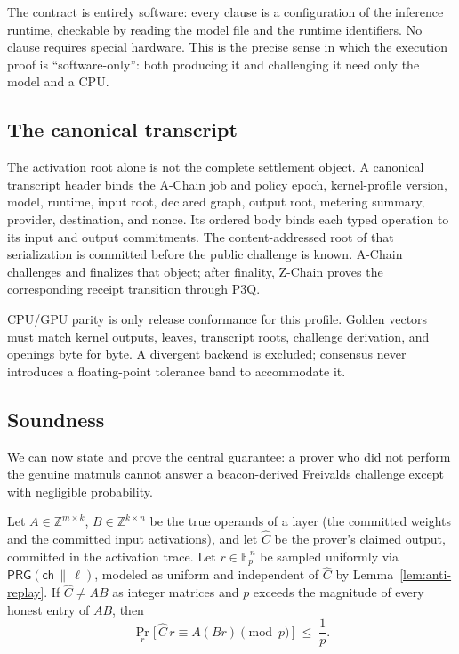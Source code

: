 The contract is entirely software: every clause is a configuration of the inference
runtime, checkable by reading the model file and the runtime identifiers. No clause
requires special hardware. This is the precise sense in which the execution proof is
``software-only'': both producing it and challenging it need only the model and a
CPU.

\subsection{The canonical transcript}

The activation root alone is not the complete settlement object. A canonical transcript
header binds the A-Chain job and policy epoch, kernel-profile version, model, runtime,
input root, declared graph, output root, metering summary, provider, destination, and
nonce. Its ordered body binds each typed operation to its input and output commitments.
The content-addressed root of that serialization is committed before the public challenge
is known. A-Chain challenges and finalizes that object; after finality, Z-Chain proves the
corresponding receipt transition through P3Q.

CPU/GPU parity is only release conformance for this profile. Golden vectors must match
kernel outputs, leaves, transcript roots, challenge derivation, and openings byte for byte.
A divergent backend is excluded; consensus never introduces a floating-point tolerance
band to accommodate it.

\subsection{Soundness}

We can now state and prove the central guarantee: a prover who did not perform the
genuine matmuls cannot answer a beacon-derived Freivalds challenge except with
negligible probability.

\begin{theorem}
\label{thm:freivalds-one}
Let $A \in \mathbb{Z}^{m \times k}$, $B \in \mathbb{Z}^{k \times n}$ be the true
operands of a layer (the committed weights and the committed input activations), and
let $\hat C$ be the prover's claimed output, committed in the activation trace. Let
$r \in \mathbb{F}_p^{\,n}$ be sampled uniformly via $\mathsf{PRG}(\mathsf{ch}\,\|\,\ell)$,
modeled as uniform and independent of $\hat C$ by Lemma~\ref{lem:anti-replay}. If
$\hat C \neq AB$ as integer matrices and $p$ exceeds the magnitude of every honest
entry of $AB$, then
\begin{equation}
\Pr_r\bigl[\,\hat C\, r \equiv A(Br) \pmod p\,\bigr] \;\le\; \frac{1}{p}.
\end{equation}
\end{theorem}

